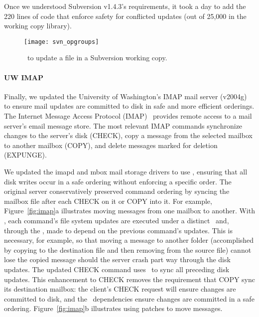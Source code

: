 Once we understood Subversion v1.4.3's requirements, it took a day to add
the 220 lines of code that enforce safety for conflicted updates (out of
25,000 in the working copy library).

\begin{figure}[t]
  \centering
  \texttt{[image: svn\_opgroups]}
  \caption{\Patchgroups\ to update a file in a Subversion working copy.}
  \label{fig:svn-order}
\end{figure}

\paragraph{UW IMAP}
\label{sec:patchgroup:uwimap}

Finally, we updated the University of Washington's IMAP mail server
(v2004g)~\cite{uwimap} to ensure mail updates are committed to disk
in safe and more efficient orderings.
%
The Internet Message Access Protocol (IMAP)~\cite{rfc3501} provides
remote access to a mail server's email message store.
%
The most relevant IMAP commands synchronize changes to the server's
disk (CHECK), copy a message from the selected mailbox to another
mailbox (COPY), and delete messages marked for deletion (EXPUNGE).

We updated the imapd and mbox mail storage drivers to use
\patchgroups, ensuring that all disk writes occur in a safe ordering
without enforcing a specific order.
%
The original server conservatively preserved command ordering by
syncing the mailbox file after each CHECK on it or COPY into it.
%
For example, Figure~\ref{fig:imap}a illustrates moving messages from
one mailbox to another.
%
With \patchgroups, each command's file system updates are executed under a
distinct \patchgroup\ and, through the \patchgroup, made to depend on the
previous command's updates. This is necessary, for example, so that
moving a message to another folder (accomplished by copying to the
destination file and then removing from the source file) cannot lose
the copied message should the server crash part way through the disk
updates.
%
The updated CHECK command uses \pgSync\ to sync all preceding disk
updates. This enhancement to CHECK removes the requirement that COPY
sync its destination mailbox: the client's CHECK request will ensure
changes are committed to disk, and the \patchgroup\ dependencies ensure
changes are committed in a safe ordering.
%
Figure~\ref{fig:imap}b illustrates using patches to move messages.
%

